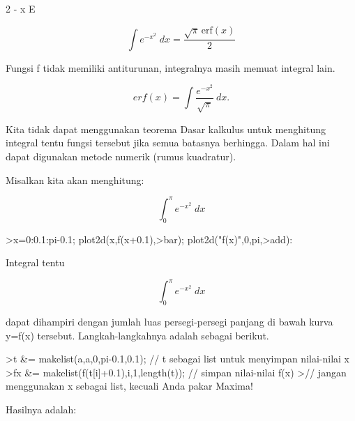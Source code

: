 \documentclass{article}
\begin{document}
\begin{eulernotebook}
\begin{eulercomment}
\begin{eulercomment}
\begin{euleroutput}
                                      2
                                   - x
                                  E
  
\end{euleroutput}
\begin{eulerformula}
\[
\int {e^ {- x^2 }}{\;dx}=\frac{\sqrt{\pi}\,\mathrm{erf}\left(x
 \right)}{2}
\]
\end{eulerformula}
\begin{eulercomment}
Fungsi f tidak memiliki antiturunan, integralnya masih memuat integral
lain.

\end{eulercomment}
\begin{eulerformula}
\[
erf(x) = \int \frac{e^{-x^2}}{\sqrt{\pi}} \ dx.
\]
\end{eulerformula}
\begin{eulercomment}
Kita tidak dapat menggunakan teorema Dasar kalkulus untuk menghitung
integral tentu fungsi tersebut jika semua batasnya berhingga. Dalam
hal ini dapat digunakan metode numerik (rumus kuadratur).

Misalkan kita akan menghitung:

\end{eulercomment}
\begin{eulerformula}
\[
\int_{0}^{\pi}{e^ {- x^2 }\;dx}
\]
\end{eulerformula}
\begin{eulerprompt}
>x=0:0.1:pi-0.1; plot2d(x,f(x+0.1),>bar); plot2d("f(x)",0,pi,>add):
\end{eulerprompt}
\begin{eulercomment}
Integral tentu

\end{eulercomment}
\begin{eulerformula}
\[
\int_{0}^{\pi}{e^ {- x^2 }\;dx}
\]
\end{eulerformula}
\begin{eulercomment}
dapat dihampiri dengan jumlah luas persegi-persegi panjang di bawah
kurva y=f(x) tersebut. Langkah-langkahnya adalah sebagai berikut.
\end{eulercomment}
\begin{eulerprompt}
>t &= makelist(a,a,0,pi-0.1,0.1); // t sebagai list untuk menyimpan nilai-nilai x
>fx &= makelist(f(t[i]+0.1),i,1,length(t)); // simpan nilai-nilai f(x)
>// jangan menggunakan x sebagai list, kecuali Anda pakar Maxima!
\end{eulerprompt}
\begin{eulercomment}
Hasilnya adalah:


\end{eulercomment}
\end{eulercomment}
\end{eulercomment}
\end{eulernotebook}
\end{document}
